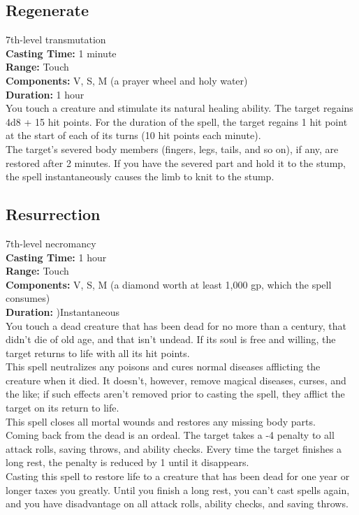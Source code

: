 \documentclass[11pt, A4paper, english]{article}
\begin{document}
		\subsection{Regenerate}
7th-level transmutation \\
\textbf{Casting Time:} 1 minute \\
\textbf{Range:} Touch \\
\textbf{Components:} V, S, M (a prayer wheel and holy water) \\
\textbf{Duration:} 1 hour \\
You touch a creature and stimulate its natural healing ability. The target regains 4d8 + 15 hit points. For the duration of the spell, the target regains 1 hit point at the start of each of its turns (10 hit points each minute). \\
The target’s severed body members (fingers, legs, tails, and so on), if any, are restored after 2 minutes. If you have the severed part and hold it to the stump, the spell instantaneously causes the limb to knit to the stump.

		\subsection{Resurrection}
7th-level necromancy \\
\textbf{Casting Time:} 1 hour \\
\textbf{Range:} Touch \\
\textbf{Components:} V, S, M (a diamond worth at least 1,000 gp, which the spell consumes) \\
\textbf{Duration:} )Instantaneous \\
You touch a dead creature that has been dead for no more than a century, that didn’t die of old age, and that isn’t undead. If its soul is free and willing, the target returns to life with all its hit points. \\
This spell neutralizes any poisons and cures normal diseases afflicting the creature when it died. It doesn’t, however, remove magical diseases, curses, and the like; if such effects aren't removed prior to casting the spell, they afflict the target on its return to life. \\
This spell closes all mortal wounds and restores any missing body parts. \\
Coming back from the dead is an ordeal. The target takes a -4 penalty to all attack rolls, saving throws, and ability checks. Every time the target finishes a long rest, the penalty is reduced by 1 until it disappears. \\
Casting this spell to restore life to a creature that has been dead for one year or longer taxes you greatly. Until you finish a long rest, you can’t cast spells again, and you have disadvantage on all attack rolls, ability checks, and saving throws.
\end{document}
